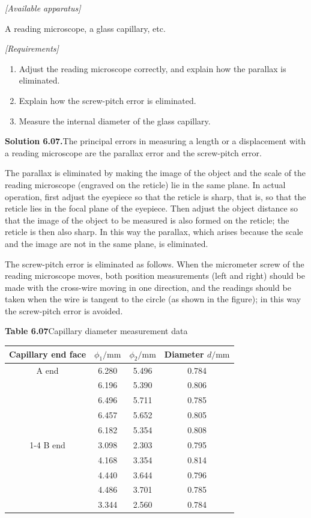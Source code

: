 \noindent\textit{[Available apparatus]}

A reading microscope, a glass capillary, etc.

\noindent\textit{[Requirements]}
\begin{enumerate}[label=(\arabic*),leftmargin=2.2em,itemsep=1pt,topsep=2pt]
\item Adjust the reading microscope correctly, and explain how the parallax is eliminated.
\item Explain how the screw-pitch error is eliminated.
\item Measure the internal diameter of the glass capillary.
\end{enumerate}

\medskip
\noindent\textbf{Solution 6.07.}\quad The principal errors in measuring a length or a displacement with a reading microscope are the parallax error and the screw-pitch error.

The parallax is eliminated by making the image of the object and the scale of the reading microscope (engraved on the reticle) lie in the same plane. In actual operation, first adjust the eyepiece so that the reticle is sharp, that is, so that the reticle lies in the focal plane of the eyepiece. Then adjust the object distance so that the image of the object to be measured is also formed on the reticle; the reticle is then also sharp. In this way the parallax, which arises because the scale and the image are not in the same plane, is eliminated.

The screw-pitch error is eliminated as follows. When the micrometer screw of the reading microscope moves, both position measurements (left and right) should be made with the cross-wire moving in one direction, and the readings should be taken when the wire is tangent to the circle (as shown in the figure); in this way the screw-pitch error is avoided.

\begin{center}
\textbf{Table 6.07}\quad Capillary diameter measurement data\\[3pt]
\begin{tabular}{cccc}
\toprule
Capillary end face & $\phi_1/\mathrm{mm}$ & $\phi_2/\mathrm{mm}$ & Diameter $d/\mathrm{mm}$\\
\midrule
A end & 6.280 & 5.496 & 0.784\\
      & 6.196 & 5.390 & 0.806\\
      & 6.496 & 5.711 & 0.785\\
      & 6.457 & 5.652 & 0.805\\
      & 6.182 & 5.354 & 0.808\\
\cmidrule(lr){1-4}
B end & 3.098 & 2.303 & 0.795\\
      & 4.168 & 3.354 & 0.814\\
      & 4.440 & 3.644 & 0.796\\
      & 4.486 & 3.701 & 0.785\\
      & 3.344 & 2.560 & 0.784\\
\bottomrule
\end{tabular}
\end{center}

